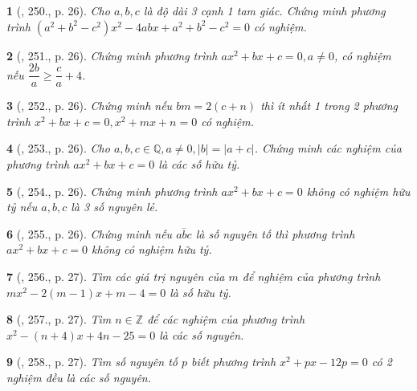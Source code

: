 \documentclass{article}
\newtheorem{baitoan}{}
\begin{document}
\begin{baitoan}[\cite{Binh_Toan_9_tap_2}, 250., p. 26]
	Cho $a,b,c$ là độ dài 3 cạnh 1 tam giác. Chứng minh phương trình $(a^2 + b^2 - c^2)x^2 - 4abx + a^2 + b^2 - c^2 = 0$ có nghiệm.
\end{baitoan}

\begin{baitoan}[\cite{Binh_Toan_9_tap_2}, 251., p. 26]
	Chứng minh phương trình $ax^2 + bx + c = 0,a\ne0$, có nghiệm nếu $\dfrac{2b}{a}\ge\dfrac{c}{a} + 4$.
\end{baitoan}

\begin{baitoan}[\cite{Binh_Toan_9_tap_2}, 252., p. 26]
	Chứng minh nếu $bm = 2(c + n)$ thì ít nhất 1 trong 2 phương trình $x^2 + bx + c = 0,x^2 + mx + n = 0$ có nghiệm.
\end{baitoan}

\begin{baitoan}[\cite{Binh_Toan_9_tap_2}, 253., p. 26]
	Cho $a,b,c\in\mathbb{Q},a\ne0,|b| = |a + c|$. Chứng minh các nghiệm của phương trình $ax^2 + bx + c = 0$ là các số hữu tỷ.
\end{baitoan}

\begin{baitoan}[\cite{Binh_Toan_9_tap_2}, 254., p. 26]
	Chứng minh phương trình $ax^2 + bx + c = 0$ không có nghiệm hữu tỷ nếu $a,b,c$ là 3 số nguyên lẻ.
\end{baitoan}

\begin{baitoan}[\cite{Binh_Toan_9_tap_2}, 255., p. 26]
	Chứng minh nếu $\overline{abc}$ là số nguyên tố thì phương trình $ax^2 + bx + c = 0$ không có nghiệm hữu tỷ.
\end{baitoan}

\begin{baitoan}[\cite{Binh_Toan_9_tap_2}, 256., p. 27]
	Tìm các giá trị nguyên của $m$ để nghiệm của phương trình $mx^2 - 2(m - 1)x + m - 4 = 0$ là số hữu tỷ.
\end{baitoan}

\begin{baitoan}[\cite{Binh_Toan_9_tap_2}, 257., p. 27]
	Tìm $n\in\mathbb{Z}$ để các nghiệm của phương trình $x^2 - (n + 4)x + 4n - 25 = 0$ là các số nguyên.
\end{baitoan}

\begin{baitoan}[\cite{Binh_Toan_9_tap_2}, 258., p. 27]
	Tìm số nguyên tố $p$ biết phương trình $x^2 + px - 12p = 0$ có 2 nghiệm đều là các số nguyên.
\end{baitoan}
\end{document}
